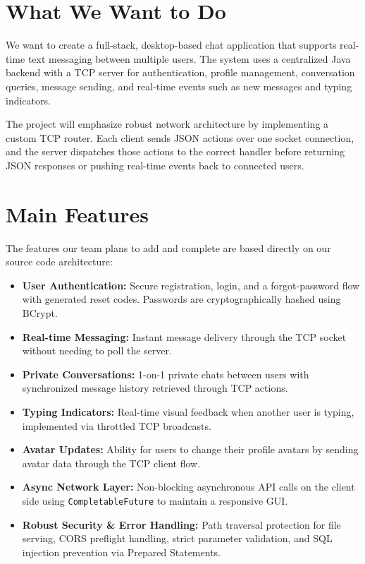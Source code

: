 \documentclass[11pt]{article}
\begin{document}
\section{What We Want to Do}

We want to create a full-stack, desktop-based chat application that supports real-time text messaging between multiple users. The system uses a centralized Java backend with a TCP server for authentication, profile management, conversation queries, message sending, and real-time events such as new messages and typing indicators.

The project will emphasize robust network architecture by implementing a custom TCP router. Each client sends JSON actions over one socket connection, and the server dispatches those actions to the correct handler before returning JSON responses or pushing real-time events back to connected users.

\section{Main Features}

The features our team plans to add and complete are based directly on our source code architecture:

\begin{itemize}
    \item \textbf{User Authentication:} Secure registration, login, and a forgot-password flow with generated reset codes. Passwords are cryptographically hashed using BCrypt.
    \item \textbf{Real-time Messaging:} Instant message delivery through the TCP socket without needing to poll the server.
    \item \textbf{Private Conversations:} 1-on-1 private chats between users with synchronized message history retrieved through TCP actions.
    \item \textbf{Typing Indicators:} Real-time visual feedback when another user is typing, implemented via throttled TCP broadcasts.
    \item \textbf{Avatar Updates:} Ability for users to change their profile avatars by sending avatar data through the TCP client flow.
    \item \textbf{Async Network Layer:} Non-blocking asynchronous API calls on the client side using \texttt{CompletableFuture} to maintain a responsive GUI.
    \item \textbf{Robust Security \& Error Handling:} Path traversal protection for file serving, CORS preflight handling, strict parameter validation, and SQL injection prevention via Prepared Statements.
\end{itemize}
\end{document}
